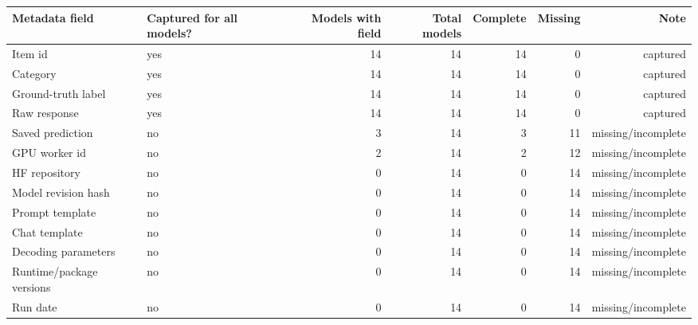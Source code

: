 \begin{tabular}{llrrrrr}
\toprule
Metadata field & Captured for all models? & Models with field & Total models & Complete & Missing & Note \\
\midrule
Item id & yes & 14 & 14 & 14 & 0 & captured \\
Category & yes & 14 & 14 & 14 & 0 & captured \\
Ground-truth label & yes & 14 & 14 & 14 & 0 & captured \\
Raw response & yes & 14 & 14 & 14 & 0 & captured \\
Saved prediction & no & 3 & 14 & 3 & 11 & missing/incomplete \\
GPU worker id & no & 2 & 14 & 2 & 12 & missing/incomplete \\
HF repository & no & 0 & 14 & 0 & 14 & missing/incomplete \\
Model revision hash & no & 0 & 14 & 0 & 14 & missing/incomplete \\
Prompt template & no & 0 & 14 & 0 & 14 & missing/incomplete \\
Chat template & no & 0 & 14 & 0 & 14 & missing/incomplete \\
Decoding parameters & no & 0 & 14 & 0 & 14 & missing/incomplete \\
Runtime/package versions & no & 0 & 14 & 0 & 14 & missing/incomplete \\
Run date & no & 0 & 14 & 0 & 14 & missing/incomplete \\
\bottomrule
\end{tabular}
